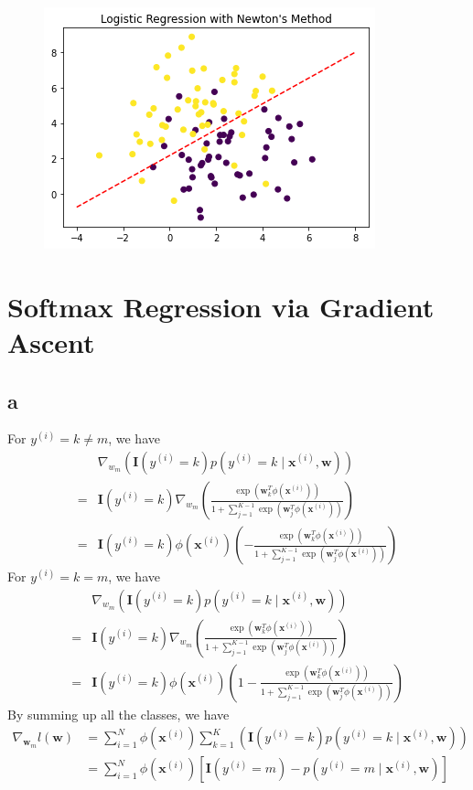 \documentclass{article}
\begin{document}
\begin{figure}[htbp]
    \centering
    \includegraphics[width=.6\textwidth]{q1.png}
\end{figure}

\section{Softmax Regression via Gradient Ascent}

\subsection*{a}

For $y^{(i)} = k \neq m$, we have
$$
\begin{aligned}
& \nabla_{w_{m}}(\mathbf{I}(y^{(i)}=k)  p(y^{(i)}=k \mid \mathbf{x}^{(i)}, \mathbf{w})) \\
=& \mathbf{I}(y^{(i)}=k)  \nabla_{w_{m}}(\frac{\exp (\mathbf{w}_{k}^{T} \phi(\mathbf{x}^{(i)}))}{1+\sum_{j=1}^{K-1} \exp (\mathbf{w}_{j}^{T} \phi(\mathbf{x}^{(i)}))}) \\
=& \mathbf{I}(y^{(i)}=k)  \phi(\mathbf{x}^{(i)}) (-\frac{\exp (\mathbf{w}_{k}^{T} \phi(\mathbf{x}^{(i)}))}{1+\sum_{j=1}^{K-1} \exp (\mathbf{w}_{j}^{T} \phi(\mathbf{x}^{(i)}))})
\end{aligned}
$$
For $y^{(i)} = k = m$, we have
$$
\begin{aligned}
& \nabla_{w_{m}}(\mathbf{I}(y^{(i)}=k)  p(y^{(i)}=k \mid \mathbf{x}^{(i)}, \mathbf{w})) \\
=& \mathbf{I}(y^{(i)}=k)  \nabla_{w_{m}}(\frac{\exp (\mathbf{w}_{k}^{T} \phi(\mathbf{x}^{(i)}))}{1+\sum_{j=1}^{K-1} \exp (\mathbf{w}_{j}^{T} \phi(\mathbf{x}^{(i)}))}) \\
=& \mathbf{I}(y^{(i)}=k)  \phi(\mathbf{x}^{(i)}) (1-\frac{\exp (\mathbf{w}_{k}^{T} \phi(\mathbf{x}^{(i)}))}{1+\sum_{j=1}^{K-1} \exp (\mathbf{w}_{j}^{T} \phi(\mathbf{x}^{(i)}))})
\end{aligned}
$$
By summing up all the classes, we have
$$
\begin{aligned}
\nabla_{\mathbf{w}_{m}} l(\mathbf{w}) &=\sum_{i=1}^{N} \phi(\mathbf{x}^{(i)}) \sum_{k=1}^{K}(\mathbf{I}(y^{(i)}=k)  p(y^{(i)}=k \mid \mathbf{x}^{(i)}, \mathbf{w})) \\
&=\sum_{i=1}^{N} \phi(\mathbf{x}^{(i)})\left[\mathbf{I}(y^{(i)}=m)-p(y^{(i)}=m \mid \mathbf{x}^{(i)}, \mathbf{w})\right]
\end{aligned}
$$
\end{document}
